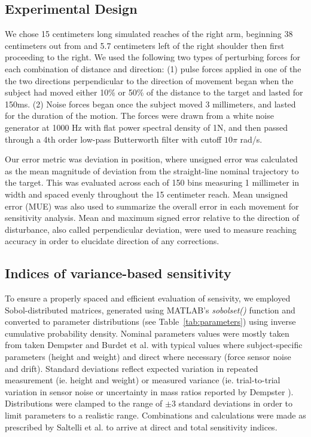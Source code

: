 \documentclass[10pt]{article}
\begin{document}
\subsection*{Experimental Design}
We chose 15 centimeters long simulated reaches of the right arm, beginning 38 centimeters out from and 5.7 centimeters left of the right shoulder then first proceeding to the right.  We used the following two types of perturbing forces for each combination of distance and direction: 
(1) pulse forces applied in one of the the two directions perpendicular to the direction of movement began when the subject had moved either 10\% or 50\% of the distance to the target and lasted for 150ms.
(2) Noise forces began once the subject moved 3 millimeters, and lasted for the duration of the motion. The forces were drawn from a white noise generator at 1000 Hz with flat power spectral density of 1N, and then passed through a 4th order low-pass Butterworth filter with cutoff $10 \pi$ rad/s.

Our error metric was deviation in position, where unsigned error was calculated as the mean magnitude of deviation from the straight-line nominal trajectory to the target. This was evaluated across each of 150 bins measuring 1 millimeter in width and spaced evenly throughout the 15 centimeter reach. Mean unsigned error (MUE) was also used to summarize the overall error in each movement for sensitivity analysis. Mean and maximum signed error relative to the direction of disturbance, also called perpendicular deviation, were used to measure reaching accuracy in order to elucidate direction of any corrections.

\subsection*{Indices of variance-based sensitivity}
To ensure a properly spaced and efficient evaluation of sensivity, we employed Sobol-distributed matrices, generated using MATLAB's \textit{sobolset()} function and converted to parameter distributions (see Table~\ref{tab:parameters}) using inverse cumulative probability density. Nominal parameters values were mostly taken from taken Dempster \cite{dempster1955space} and Burdet et al. \cite{burdet2006stability} with typical values where subject-specific parameters (height and weight) and direct where necessary (force sensor noise and drift). Standard deviations reflect expected variation in repeated measurement (ie. height and weight) or measured variance (ie. trial-to-trial variation in sensor noise or uncertainty in mass ratios reported by Dempster \cite{dempster1955space}). Distributions were clamped to the range of $\pm3$ standard deviations in order to limit parameters to a realistic range. Combinations and calculations were made as prescribed by Saltelli et al. \cite{saltelli2010variance} to arrive at direct and total sensitivity indices.
\end{document}
